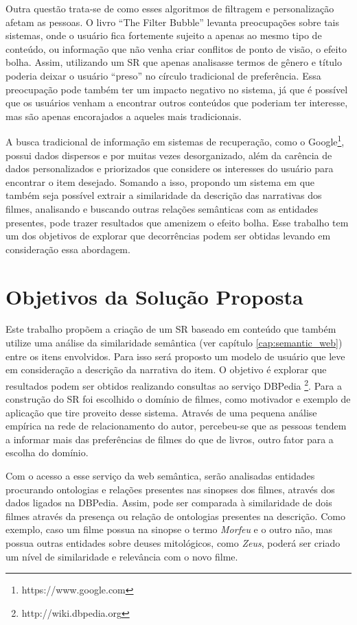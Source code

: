 Outra questão trata-se de como esses algoritmos de filtragem e personalização afetam as pessoas. O livro “The Filter Bubble” \cite{Pariser:2011} levanta preocupações sobre tais sistemas, onde o usuário fica fortemente sujeito a apenas ao mesmo tipo de conteúdo, ou informação que não venha criar conflitos de ponto de visão, o efeito bolha. Assim, utilizando um SR que apenas analisasse termos de gênero e título poderia deixar o usuário “preso” no círculo tradicional de preferência. Essa preocupação pode também ter um impacto negativo no sistema, já que é possível que os usuários venham a encontrar outros conteúdos que poderiam ter interesse, mas são apenas encorajados a aqueles mais tradicionais. 

A busca tradicional de informação em sistemas de recuperação, como o Google\footnote{https://www.google.com}, possui dados dispersos e por muitas vezes desorganizado, além da carência de dados personalizados e priorizados que considere os interesses do usuário para encontrar o item desejado. Somando a isso, propondo um sistema em que também seja possível extrair a similaridade da descrição das narrativas dos filmes, analisando e buscando outras relações semânticas com as entidades presentes, pode trazer resultados que amenizem o efeito bolha. Esse trabalho tem um dos objetivos de explorar que decorrências podem ser obtidas levando em consideração essa abordagem.

\section{Objetivos da Solução Proposta}

Este trabalho propõem a criação de um SR baseado em conteúdo que também utilize uma análise da similaridade semântica (ver capítulo \ref{cap:semantic_web}) entre os itens envolvidos. Para isso será proposto um modelo de usuário que leve em consideração a descrição da narrativa do item. O objetivo é explorar que resultados podem ser obtidos realizando consultas ao serviço DBPedia \footnote{http://wiki.dbpedia.org}. Para a construção do SR foi escolhido o domínio de filmes, como motivador e exemplo de aplicação que tire proveito desse sistema. Através de uma pequena análise empírica na rede de relacionamento do autor, percebeu-se que as pessoas tendem a informar mais das preferências de filmes do que de livros, outro fator para a escolha do domínio.

Com o acesso a esse serviço da web semântica, serão analisadas entidades procurando ontologias e relações presentes nas sinopses dos filmes, através dos dados ligados na DBPedia. Assim, pode ser comparada à similaridade de dois filmes através da presença ou relação de ontologias presentes na descrição. Como exemplo, caso um filme possua na sinopse o termo \textit{Morfeu} e o outro não, mas possua outras entidades sobre deuses mitológicos, como \textit{Zeus}, poderá ser criado um nível de similaridade e relevância com o novo filme.

